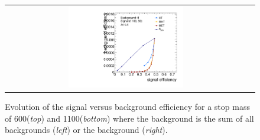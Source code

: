 \begin{figure}[!t]
{\begin{tabular}{cc}
                \includegraphics[width=0.49\textwidth]{figures/CutScan_DeltaPhiSelection_TTbar_powheg_13TeV_Stop1100_LSP50_T2tt_13TeV_HT_MET_MHT_NJets.pdf}
  \end{tabular}}
  \caption{Evolution of the signal versus background efficiency for a stop mass of 600\gev (\textit{top}) and 1100\gev (\textit{bottom}) where the background is the sum of all backgrounds (\textit{left}) or the \ttbar background (\textit{right}).}
  \label{fig:stop_baseline_cutscan_ht_met_mht_njets}
\end{figure}

